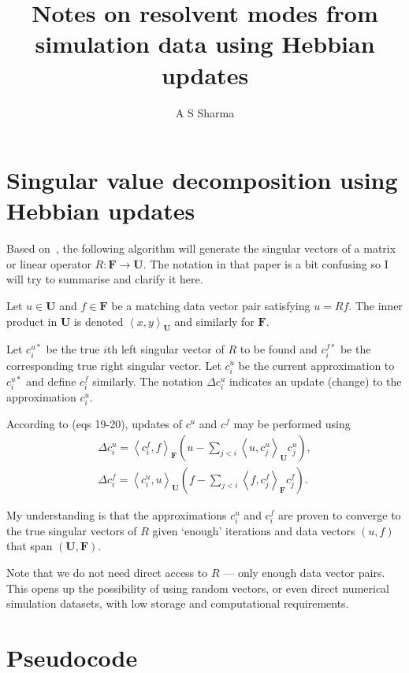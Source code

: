 \documentclass[onecolumn, twoside, 11pt]{article}
\title{Notes on resolvent modes from simulation data using Hebbian updates}
\author{A S Sharma}
\newcommand{\inprod}[2]{\left<{#1},{#2}\right>}
\newcommand\mU{\mathbf{U}}
\newcommand\mF{\mathbf{F}}
\begin{document}
\maketitle

\section{Singular value decomposition using Hebbian updates}

Based on~\cite{conf/eacl/Gorrell06}, the following algorithm will generate the singular vectors of a matrix or linear operator $R: \mF \rightarrow \mU$.
The notation in that paper is a bit confusing so I will try to summarise and clarify it here.

Let $u \in \mU$ and $f \in \mF$ be a matching data vector pair satisfying $u = Rf$. The inner product in $\mU$ is denoted $\inprod{x}{y}_\mU$ and similarly for $\mF$.

Let $c^{u*}_i$ be the true $i$th left singular vector of $R$ to be found and $c^{f*}_i$ be the corresponding true right singular vector.
Let $c^u_i$ be the current approximation to $c^{u*}_i$ and define $c^f_i$ similarly.
The notation $\Delta c^u_i$ indicates an update (change) to the approximation $c^u_i$.

According to \cite{conf/eacl/Gorrell06} (eqs 19-20), updates of $c^u$ and $c^f$ may be performed using
\begin{eqnarray}
    \label{eq:updates}
    \Delta c^u_i = \inprod{c^f_i}{f}_\mF ( u - \sum_{j<i} \inprod{u}{c^u_j}_\mU c^u_j), \\
    \Delta c^f_i = \inprod{c^u_i}{u}_\mU ( f - \sum_{j<i} \inprod{f}{c^f_j}_\mF c^f_j).
\end{eqnarray}

My understanding is that the approximations $c^u_i$ and $c^f_i$ are proven to converge to the true singular vectors of $R$ given `enough' iterations and data vectors $(u,f)$ that span $(\mU,\mF)$.

Note that we do not need direct access to $R$ --- only enough data vector pairs. This opens up the possibility of using random vectors, or even direct numerical simulation datasets, with low storage and computational requirements.

\section{Pseudocode}
\end{document}
